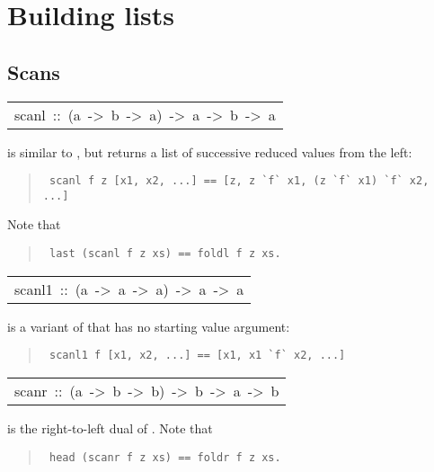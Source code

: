 \section{Building lists
}
\subsection{Scans
}
\begin{haddockdesc}
\item[\begin{tabular}{@{}l}
scanl\ ::\ (a\ ->\ b\ ->\ a)\ ->\ a\ ->\ {\char 91}b{\char 93}\ ->\ {\char 91}a{\char 93}
\end{tabular}]\haddockbegindoc
{} is similar to , but returns a list of successive
 reduced values from the left:
\par
\begin{quote}
{\haddockverb\begin{verbatim}
 scanl f z [x1, x2, ...] == [z, z `f` x1, (z `f` x1) `f` x2, ...]
\end{verbatim}}
\end{quote}
Note that
\par
\begin{quote}
{\haddockverb\begin{verbatim}
 last (scanl f z xs) == foldl f z xs.
\end{verbatim}}
\end{quote}

\end{haddockdesc}
\begin{haddockdesc}
\item[\begin{tabular}{@{}l}
scanl1\ ::\ (a\ ->\ a\ ->\ a)\ ->\ {\char 91}a{\char 93}\ ->\ {\char 91}a{\char 93}
\end{tabular}]\haddockbegindoc
{} is a variant of  that has no starting value argument:
\par
\begin{quote}
{\haddockverb\begin{verbatim}
 scanl1 f [x1, x2, ...] == [x1, x1 `f` x2, ...]
\end{verbatim}}
\end{quote}

\end{haddockdesc}
\begin{haddockdesc}
\item[\begin{tabular}{@{}l}
scanr\ ::\ (a\ ->\ b\ ->\ b)\ ->\ b\ ->\ {\char 91}a{\char 93}\ ->\ {\char 91}b{\char 93}
\end{tabular}]\haddockbegindoc
{} is the right-to-left dual of .
 Note that
\par
\begin{quote}
{\haddockverb\begin{verbatim}
 head (scanr f z xs) == foldr f z xs.
\end{verbatim}}
\end{quote}

\end{haddockdesc}
